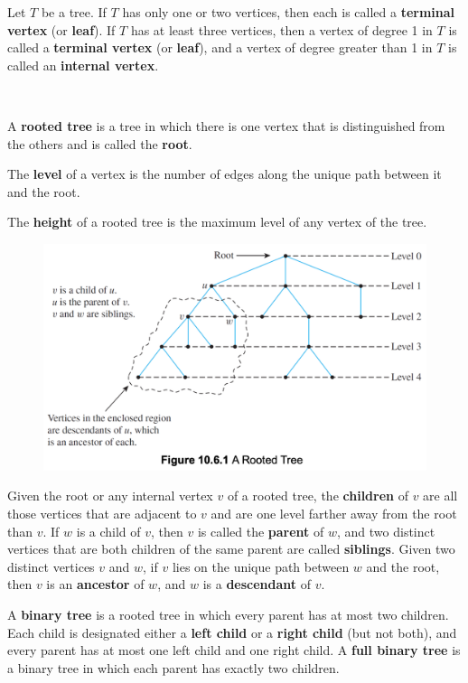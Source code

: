 \documentclass{article}
\begin{document}
\begin{description}
    \item[Terminal vertex (leaf) and internal vertex]Let $T$ be a tree. If $T$ has only one or two vertices, then each is called a \textbf{terminal vertex} (or \textbf{leaf}). If $T$ has at least three vertices, then a vertex of degree 1 in $T$ is called a \textbf{terminal vertex} (or \textbf{leaf}), and a vertex of degree greater than 1 in $T$ is called an \textbf{internal vertex}.
    \item[Rooted Tree, Level, Height] \
    \item \qquad A \textbf{rooted tree} is a tree in which there is one vertex that is distinguished from the others and is called the \textbf{root}. 
    \item \qquad The \textbf{level} of a vertex is the number of edges along the unique path between it and the root.
    \item \qquad The \textbf{height} of a rooted tree is the maximum level of any vertex of the tree.
    
    \begin{figure}[H]
    	\centering
	    \includegraphics[scale=0.5]{rooted_tree}
	\end{figure}
	
    \item[Child, Parent, Sibling, Ancestor, Descendant] Given the root or any internal vertex $v$ of a rooted tree, the \textbf{children} of $v$ are all those vertices that are adjacent to $v$ and are one level farther away from the root than $v$. If $w$ is a child of $v$, then $v$ is called the \textbf{parent} of $w$, and two distinct vertices that are both children of the same parent are called \textbf{siblings}. Given two distinct vertices $v$ and $w$, if $v$ lies on the unique path between $w$ and the root, then $v$ is an \textbf{ancestor} of $w$, and $w$ is a \textbf{descendant} of $v$.
    \item[Binary Tree, Full Binary Tree]A \textbf{binary tree} is a rooted tree in which every parent has at most two children. Each child is designated either a \textbf{left child} or a \textbf{right child} (but not both), and every parent has at most one left child and one right child. A \textbf{full binary tree} is a binary tree in which each parent has exactly two children.
    

\end{description}
\end{document}
